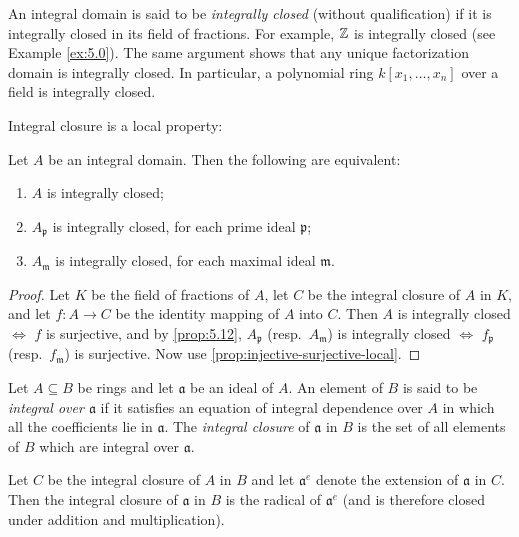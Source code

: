 An integral domain is said to be \emph{integrally closed} (without qualification) if it is integrally closed in its field of fractions. For example, $\mathbb{Z}$ is integrally closed (see Example \eqref{ex:5.0}). The same argument shows that any unique factorization domain is integrally closed. In particular, a polynomial ring $k[x_1, \ldots, x_n]$ over a field is integrally closed.

Integral closure is a local property:

\begin{proposition}\label{prop:5.13}
Let $A$ be an integral domain. Then the following are equivalent:
\begin{enumerate}
    \item[i)] $A$ is integrally closed;
    \item[ii)] $A_{\mathfrak{p}}$ is integrally closed, for each prime ideal $\mathfrak{p}$;
    \item[iii)] $A_{\mathfrak{m}}$ is integrally closed, for each maximal ideal $\mathfrak{m}$.
\end{enumerate}
\end{proposition}
\begin{proof}
    Let $K$ be the field of fractions of $A$, let $C$ be the integral closure of $A$ in $K$, and let $f \colon A \to C$ be the identity mapping of $A$ into $C$. Then $A$ is integrally closed $\iff$ $f$ is surjective, and by \eqref{prop:5.12}, $A_{\mathfrak{p}}$ (resp.~$A_{\mathfrak{m}}$) is integrally closed $\iff$ $f_{\mathfrak{p}}$ (resp.~$f_{\mathfrak{m}}$) is surjective. Now use \eqref{prop:injective-surjective-local}.
\end{proof}

Let $A \subseteq B$ be rings and let $\mathfrak{a}$ be an ideal of $A$. An element of $B$ is said to be \emph{integral over $\mathfrak{a}$} if it satisfies an equation of integral dependence over $A$ in which all the coefficients lie in $\mathfrak{a}$. The \emph{integral closure} of $\mathfrak{a}$ in $B$ is the set of all elements of $B$ which are integral over $\mathfrak{a}$.

\begin{lemma}\label{lem:5.14}
Let $C$ be the integral closure of $A$ in $B$ and let $\mathfrak{a}^e$ denote the extension of $\mathfrak{a}$ in $C$. Then the integral closure of $\mathfrak{a}$ in $B$ is the radical of $\mathfrak{a}^e$ (and is therefore closed under addition and multiplication).
\end{lemma}


